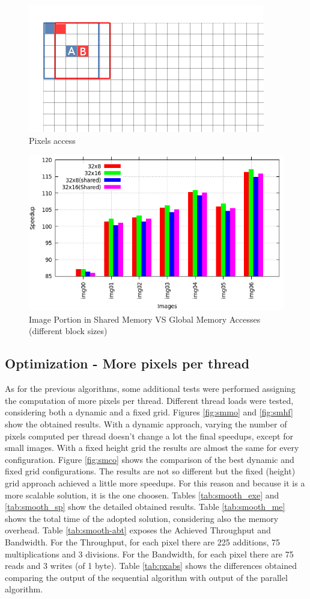 \documentclass[a4paper]{article}
\begin{document}
\begin{figure}[!ht]
    \centering
    \includegraphics[width=0.5\linewidth]{grid_smooth_colored}
    \caption{Pixels access}
    \label{fig:smoothpa}
\end{figure}
\FloatBarrier

\begin{figure}[!ht]
    \centering
    \includegraphics[width=0.7\linewidth]{res/new/smooth_shared_no}
    \caption{Image Portion in Shared Memory VS Global Memory Accesses (different block sizes)}
    \label{fig:smoothsn}
\end{figure}
\FloatBarrier

\subsection{Optimization - More pixels per thread}
\label{sec:sop}
As for the previous algorithms, some additional tests were performed assigning the computation of more pixels per thread. Different thread loads were tested, considering both a dynamic and a fixed grid. Figures \ref{fig:smmo} and \ref{fig:smhf} show the obtained results. With a dynamic approach, varying the number of pixels computed per thread doesn't change a lot the final speedups, except for small images. With a fixed height grid the results are almost the same for every configuration. Figure \ref{fig:smco} shows the comparison of the best dynamic and fixed grid configurations. The results are not so different but the fixed (height) grid approach achieved a little more speedups. For this reason and because it is a more scalable solution, it is the one choosen. Tables \ref{tab:smooth_exe} and \ref{tab:smooth_sp} show the detailed obtained results. Table \ref{tab:smooth_me} shows the total time of the adopted solution, considering also the memory overhead. Table \ref{tab:smooth-abt} exposes the Achieved Throughput and Bandwidth. For the Throughput, for each pixel there are 225 additions, 75 multiplications and 3 divisions. For the Bandwidth, for each pixel there are 75 reads and 3 writes (of 1 byte).
Table \ref{tab:pxabs} shows the differences obtained comparing the output of the sequential algorithm with output of the parallel algorithm.
\end{document}
